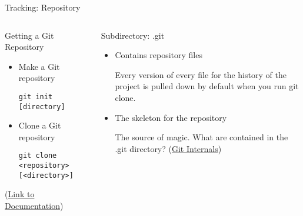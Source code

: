 \begin{frame}[fragile]{Tracking: Repository}
  \begin{columns}[t]
    \begin{column}{0.5\textwidth}
      Getting a Git Repository
      \begin{itemize}
        \item Make a Git repository
        \begin{verbatim}
git init [directory]
        \end{verbatim}
        \item Clone a Git repository
        \begin{verbatim}
git clone <repository> [<directory>]
        \end{verbatim}
      \end{itemize}
      \begin{center}
        (\href{https://git-scm.com/doc}{Link to Documentation})
      \end{center}
    \end{column}
    \begin{column}{0.5\textwidth}
      Subdirectory: .git
      \begin{itemize}
        \item Contains repository files
        \begin{flushleft}
          \footnotesize
Every version of every file for the history of the project is pulled down by
default when you run git clone.
        \end{flushleft}
        \item The skeleton for the repository
        \begin{flushleft}
          \footnotesize
The source of magic. What are contained in the .git directory? 
(\href{https://git-scm.com/book/en/v2/Git-Internals-Git-Objects}{Git Internals})
        \end{flushleft}
      \end{itemize}
    \end{column}
  \end{columns}
\end{frame}
